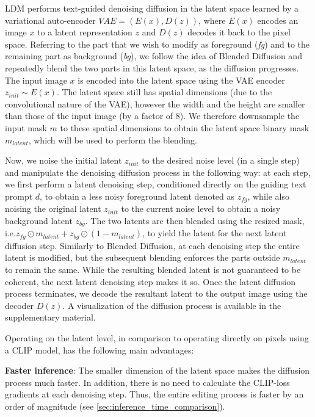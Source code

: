 LDM performs text-guided denoising diffusion in the latent space learned by a variational auto-encoder $\textit{VAE} = (E(x), D(z))$, where $E(x)$ encodes an image $x$ to a latent representation $z$ and $D(z)$ decodes it back to the pixel space. Referring to the part that we wish to modify as foreground (\emph{fg}) and to the remaining part as background (\emph{bg}), we follow the idea of Blended Diffusion and repeatedly blend the two parts in this latent space, as the diffusion progresses. The input image $x$ is encoded into the latent space using the VAE encoder $z_{\textit{init}} \sim E(x)$. The latent space still has spatial dimensions (due to the convolutional nature of the VAE), however the width and the height are smaller than those of the input image (by a factor of 8). We therefore downsample the input mask $m$ to these spatial dimensions to obtain the latent space binary mask $m_{\textit{latent}}$, which will be used to perform the blending.

Now, we noise the initial latent $z_{\textit{init}}$ to the desired noise level (in a single step) and manipulate the denoising diffusion process in the following way: at each step, we first perform a latent denoising step, conditioned directly on the guiding text prompt $d$, to obtain a less noisy foreground latent denoted as $z_{\textit{fg}}$, while also noising the original latent $z_{\textit{init}}$ to the current noise level to obtain a noisy background latent $z_{\textit{bg}}$. The two latents are then blended using the resized mask, {i.e.}$z_{\textit{fg}} \odot m_{\textit{latent}} + z_{\textit{bg}} \odot (1 - m_{\textit{latent}})$, to yield the latent for the next latent diffusion step. Similarly to Blended Diffusion, at each denoising step the entire latent is modified, but the subsequent blending enforces the parts outside $m_{\textit{latent}}$ to remain the same. While the resulting blended latent is not guaranteed to be coherent, the next latent denoising step makes it so. Once the latent diffusion process terminates, we decode the resultant latent to the output image using the decoder $D(z)$. A visualization of the diffusion process is available in the supplementary material.

Operating on the latent level, in comparison to operating directly on pixels using a CLIP model, has the following main advantages:

\textbf{Faster inference}: The smaller dimension of the latent space makes the diffusion process much faster. In addition, there is no need to calculate the CLIP-loss gradients at each denoising step. Thus, the entire editing process is faster by an order of magnitude (see \ref{sec:inference_time_comparison}).

